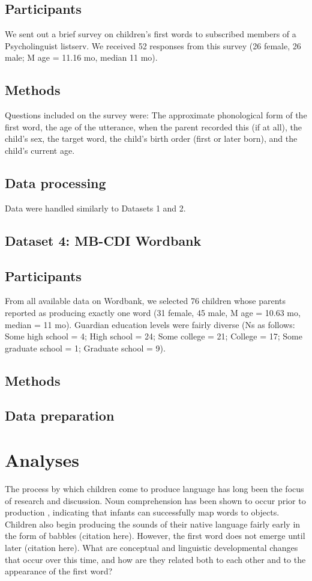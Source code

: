 \documentclass[10pt,letterpaper]{article}
\begin{document}
\subsection{Participants}
We sent out a brief survey on children's first words to subscribed members of a Psycholinguist listserv. We received 52 responses from this survey (26 female, 26 male; M age = 11.16 mo, median 11 mo).

\subsection{Methods}
Questions included on the survey were: The approximate phonological form of the first word, the age of the utterance, when the parent recorded this (if at all), the child's sex, the target word, the child's birth order (first or later born), and the child's current age. 

 \subsection{Data processing}
Data were handled similarly to Datasets 1 and 2. 

\subsection{Dataset 4: MB-CDI Wordbank}

\subsection{Participants}
From all available data on Wordbank, we selected 76 children whose parents reported as producing exactly one word (31 female, 45 male, M age = 10.63 mo, median = 11 mo). Guardian education levels were fairly diverse (Ns as follows: Some high school = 4; High school = 24; Some college = 21; College = 17; Some graduate school = 1; Graduate school = 9). 

\subsection{Methods}

\subsection{Data preparation}

\section{Analyses}
The process by which children come to produce language has long been the focus of research and discussion. Noun comprehension has been shown to occur prior to production \cite{tincoff1999,tincoff2012,bergelson2012}, indicating that infants can successfully map words to objects. Children also begin producing the sounds of their native language fairly early in the form of babbles (citation here). However, the first word does not emerge until later (citation here). What are conceptual and linguistic developmental changes that occur over this time, and how are they related both to each other and to the appearance of the first word?
\end{document}
